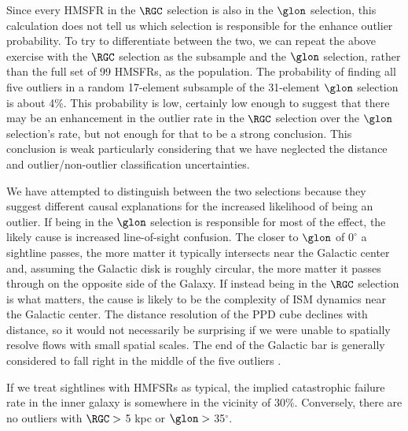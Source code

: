 Since every HMSFR in the $\RGC$ selection is also in the $\glon$ selection, this calculation does not tell us which selection is responsible for the enhance outlier probability. 
To try to differentiate between the two, we can repeat the above exercise with the $\RGC$ selection as the subsample and the $\glon$ selection, rather than the full set of 99 HMSFRs, as the population. 
The probability of finding all five outliers in a random 17-element subsample of the 31-element $\glon$ selection is about 4\%. 
This probability is low, certainly low enough to suggest that there may be an enhancement in the outlier rate in the $\RGC$ selection over the $\glon$ selection's rate, but not enough for that to be a strong conclusion.
This conclusion is weak particularly considering that we have neglected the distance and outlier/non-outlier classification uncertainties.

We have attempted to distinguish between the two selections because they suggest different causal explanations for the increased likelihood of being an outlier. 
If being in the $\glon$ selection is responsible for most of the effect, the likely cause is increased line-of-sight confusion. 
The closer to $\glon$ of $0^\circ$ a sightline passes, the more matter it typically intersects near the Galactic center and, assuming the Galactic disk is roughly circular, the more matter it passes through on the opposite side of the Galaxy. 
If instead being in the $\RGC$ selection is what matters, the cause is likely to be the complexity of ISM dynamics near the Galactic center.
The distance resolution of the PPD cube declines with distance, so it would not necessarily be surprising if we were unable to spatially resolve flows with small spatial scales.
The end of the Galactic bar is generally considered to fall right in the middle of the five outliers \cite{2016arXiv160207702B}.

If we treat sightlines with HMFSRs as typical, the implied catastrophic failure rate in the inner galaxy is somewhere in the vicinity of 30\%. 
Conversely, there are no outliers with $\RGC >$ 5 kpc or $\glon >$ 35$^\circ$.

